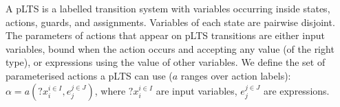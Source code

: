 \documentclass{llncs}
\newcommand{\newCoord}[1]{{\color{blue}#1}}
\begin{document}
A pLTS is a labelled transition system with variables occurring inside states,  actions, guards, and
assignments. 
Variables of each state are pairwise disjoint.
\newCoord{The parameters of actions that appear on pLTS transitions are either input variables, bound when the action occurs and accepting any value (of the right type), or expressions using the value of other variables.}
We  define the set of parameterised actions a pLTS can use ($a$
ranges over action labels):
$\alpha=a(?x_i^{i \in I}, 
e_j^{j \in J})$, where $?x_i^{i \in I}$ are input variables, $e_j^{j \in J}$ 
are expressions.
\end{document}
